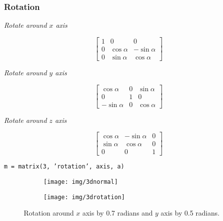 \documentclass{scrartcl}
\begin{document}
\subsubsection*{Rotation}
\noindent
\begin{center}
	\begin{minipage}{.3\linewidth}
		\begin{center}
			\textit{Rotate around $x$ axis}
		\end{center}
		$$\left[ \begin{smallmatrix} 
		1 & 0 & 0\\
		0 & \cos\alpha & -\sin\alpha\\
		0 & \sin\alpha & \cos\alpha 
		\end{smallmatrix} \right]$$
	\end{minipage}%
	\begin{minipage}{.3\linewidth}
		\begin{center}
			\textit{Rotate around $y$ axis}
		\end{center}
		$$\left[ \begin{smallmatrix} 
		\cos\alpha & 0 & \sin\alpha\\
		0 & 1 & 0\\
		-\sin\alpha & 0 & \cos\alpha 
		\end{smallmatrix} \right]$$
	\end{minipage}
	\begin{minipage}{.3\linewidth}
		\begin{center}
			\textit{Rotate around $z$ axis}
		\end{center}
		$$\left[ \begin{smallmatrix}
		\cos\alpha & -\sin\alpha & 0\\
		\sin\alpha & \cos\alpha & 0\\
		 0 & 0 & 1
		\end{smallmatrix} \right]$$
	\end{minipage}
\end{center}

\begin{center}
	\texttt{m = matrix(3, 'rotation', axis, a)}
\end{center}
\begin{figure}[H]
	\centering
	\begin{subfigure}{.41\textwidth}
		\centering
		\texttt{[image: img/3dnormal]}
	\end{subfigure}%
	\begin{subfigure}{.41\textwidth}
		\centering
		\texttt{[image: img/3drotation]}
	\end{subfigure}
	\caption{Rotation around $x$ axis by 0.7 radians and $y$ axis by 0.5 radians.}
	\label{fig:rot}
\end{figure}
\end{document}
